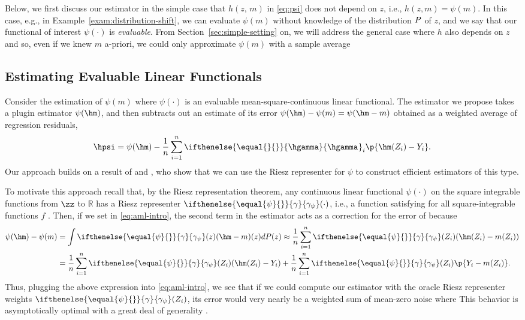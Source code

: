 \documentclass[aos,submission]{imsart}
\theoremstyle{plain}
\theoremstyle{remark}
\newcommand{\riesz}[1][]{\ifthenelse{\equal{#1}{}}{\gamma}{\gamma_{{#1}}}}
\newcommand{\hriesz}[1][]{\ifthenelse{\equal{#1}{}}{\hgamma}{\hgamma_{{#1}}}}
\newcommand{\R}{\mathbb{R}}
\begin{document}
Below, we first discuss our estimator in the simple case that 
$h(z, \, m)$ in \eqref{eq:psi} does not depend on $z$, i.e., $h(z,m)=\psi(m)$. In this case, e.g., in Example~\ref{exam:distribution-shift},
we can evaluate
$\psi(m)$ without knowledge of the distribution $\P$ of $z$, and we say that our functional of interest 
$\psi(\cdot)$ is \emph{evaluable}.
From Section~\ref{sec:simple-setting} on, we will address the general case where $h$ also
depends on $z$ and so, even if we knew $m$ a-priori, we could only approximate $\psi(m)$
with a sample average 


\subsection{Estimating Evaluable Linear Functionals}
\label{sec:amle}

Consider the estimation of $\psi(m)$ where $\psi(\cdot)$ is an evaluable mean-square-continuous linear functional.
The estimator we propose takes a plugin estimator $\psi(\hm)$, and then subtracts out an estimate of its error
$\psi(\hm)-\psi(m)=\psi(\hm-m)$ obtained as a weighted average of regression residuals,
\begin{equation}
\label{eq:aml-intro}
\hpsi = \psi(\hm) - \frac{1}{n} \sum_{i = 1}^n \hriesz_i \p{\hm(Z_i) - Y_i}.
\end{equation}
Our approach builds on a result of \citet*{chernozhukov2016locally} and \citet*{chernozhukov2018double},
who show that we can use the Riesz representer for $\psi$ to construct efficient estimators of this type.

To motivate this approach recall that, by the Riesz representation theorem,
any continuous linear functional $\psi(\cdot)$ on the square integrable functions from $\zz$ to $\R$
has a Riesz representer $\riesz[\psi](\cdot)$, i.e., a function satisfying \smash{$\int \riesz[\psi](z)f(z) d\P(z) = \psi(f)$} for all square-integrable functions $f$ \citep[e.g.,][Theorem 1.41]{peypouquet2015convex}.
Then, if we set \smash{$\hriesz_i = \riesz[\psi](Z_i)$} in \eqref{eq:aml-intro}, the second term
in the estimator acts as a correction for the error of \smash{$\psi(\hm)$} because
\begin{equation}
\label{eq:derivation}
\begin{split}
\psi(\hm) - \psi(m) &= \int \riesz[\psi](z)(\hm-m)(z) d\P(z)  
\approx \frac{1}{n}\sum_{i=1}^n \riesz[\psi](Z_i) (\hm(Z_i) - m(Z_i))  \\
&= \frac{1}{n}\sum_{i=1}^n \riesz[\psi](Z_i) (\hm(Z_i)-Y_i) + \frac{1}{n}\sum_{i=1}^n \riesz[\psi](Z_i) \p{Y_i - m(Z_i)}. 
\end{split}
\end{equation}
Thus, plugging the above expression into \eqref{eq:aml-intro}, we see that if we could compute
our estimator with the oracle Riesz representer weights $\riesz[\psi](Z_i)$, 
its error would very nearly be a weighted sum of mean-zero noise \smash{$n^{-1}\sum_{i=1}^n \riesz[\psi](Z_i) \varepsilon_i$} where 
This behavior is asymptotically optimal with a great deal of generality \citep[e.g.,][Proposition 4]{newey1994asymptotic}. 
\end{document}

